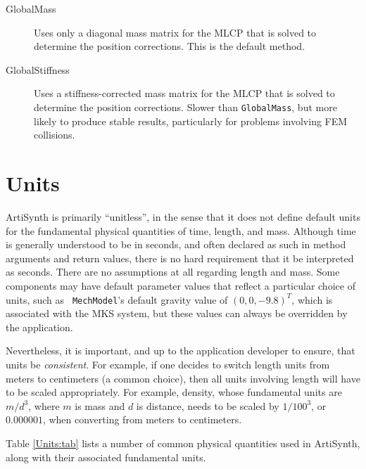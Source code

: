 \begin{description}

\item[GlobalMass]\mbox{}

Uses only a diagonal mass matrix for the MLCP that is solved to
determine the position corrections. This is the default method.

\item[GlobalStiffness]\mbox{}

Uses a stiffness-corrected mass matrix for the MLCP that is solved to
determine the position corrections. Slower than {\tt GlobalMass}, but
more likely to produce stable results, particularly for
problems involving FEM collisions.

\end{description}

\section{Units}
\label{sec:mechii:units}

ArtiSynth is primarily ``unitless'', in the sense that it does not
define default units for the fundamental physical quantities of time,
length, and mass. Although time is
generally understood to be in seconds, and often declared as such in
method arguments and return values, there is no hard requirement that
it be interpreted as seconds. There are no assumptions at all
regarding length and mass. Some components may have default parameter
values that reflect a particular choice of units, such as {\tt
MechModel}'s default gravity value of $(0, 0, -9.8)^T$, which is
associated with the MKS system, but these values can always be
overridden by the application.

Nevertheless, it is important, and up to the application developer to
ensure, that units be {\it consistent}. For example, if one decides to
switch length units from meters to centimeters (a common choice),
then all units involving length will have to be scaled appropriately.
For example, density, whose fundamental units are $m/d^3$, where $m$ is mass and
$d$ is distance, needs to be scaled by $1/100^3$, or $0.000001$, when
converting from meters to centimeters.

Table \ref{Units:tab} lists a number of common physical quantities
used in ArtiSynth, along with their associated fundamental units.

